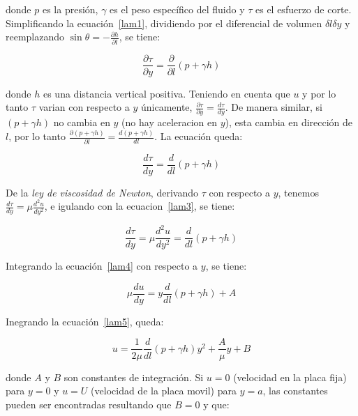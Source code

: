 \documentclass[11pt, oneside]{article}
\begin{document}
donde $p$ es la presi\'on, $\gamma$ es el peso espec\'ifico del fluido y $\tau$ es el esfuerzo de corte. Simplificando la ecuaci\'on~\ref{lam1}, dividiendo por el diferencial de volumen $\delta l \delta y$ y reemplazando $\sin \theta = -\frac{\partial h}{\partial l}$, se tiene:

\begin{equation}
\frac{\partial \tau}{\partial y} = \frac{\partial}{\partial l} (p + \gamma h)
\label{lam2}
\end{equation}

donde $h$ es una distancia vertical positiva. Teniendo en cuenta que $u$ y por lo tanto $\tau$ varian con respecto a $y$ \'unicamente, $\frac{\partial \tau}{\partial y} = \frac{d \tau}{dy}$. De manera similar, si $(p + \gamma h)$ no cambia en $y$ (no hay aceleracion en $y$), esta cambia en direcci\'on de $l$, por lo tanto $\frac{\partial (p + \gamma h)}{\partial l} = \frac{d (p + \gamma h)}{dl}$. La ecuaci\'on queda:

\begin{equation}
\frac{d \tau}{dy} = \frac{d}{dl} (p + \gamma h)
\label{lam3}
\end{equation}

De la \emph{ley de viscosidad de Newton}, derivando $\tau$ con respecto a $y$, tenemos $\frac{d \tau}{dy} = \mu \frac{d^2 u}{dy^2}$, e igulando con la ecuacion~\ref{lam3}, se tiene:

\begin{equation}
\frac{d \tau}{dy} = \mu \frac{d^2 u}{dy^2} = \frac{d}{dl} (p + \gamma h)
\label{lam4}
\end{equation}

Integrando la ecuaci\'on~\ref{lam4} con respecto a $y$, se tiene:

\begin{equation}
\mu \frac{du}{dy} = y\frac{d}{dl} (p + \gamma h) + A 
\label{lam5}
\end{equation}

Inegrando la ecuaci\'on~\ref{lam5}, queda:

\begin{equation}
u = \frac{1}{2\mu} \frac{d}{dl} (p + \gamma h) y^2 + \frac{A}{\mu}y + B 
\label{lam6}
\end{equation}

donde $A$ y $B$ son constantes de integraci\'on. Si $u=0$ (velocidad en la placa fija) para $y=0$ y $u=U$ (velocidad de la placa movil) para $y=a$, las constantes pueden ser encontradas resultando que $B=0$ y que:
\end{document}
